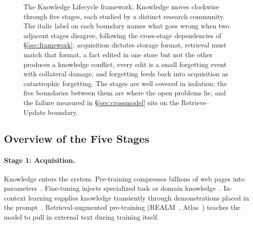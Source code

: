 \documentclass[manuscript, screen, review]{jair}
\begin{document}
\begin{figure}[t]
\caption{The Knowledge Lifecycle framework. Knowledge moves clockwise through five stages, each studied by a distinct research community. The italic label on each boundary names what goes wrong when two adjacent stages disagree, following the cross-stage dependencies of \S\ref{sec:framework}: acquisition dictates storage format, retrieval must match that format, a fact edited in one store but not the other produces a knowledge conflict, every edit is a small forgetting event with collateral damage, and forgetting feeds back into acquisition as catastrophic forgetting. The stages are well covered in isolation; the five boundaries between them are where the open problems lie, and the failure measured in \S\ref{sec:crossmodel} sits on the Retrieve--Update boundary.}
\label{fig:lifecycle}
\end{figure}

\subsection{Overview of the Five Stages}

\paragraph{Stage 1: Acquisition.} Knowledge enters the system. Pre-training compresses billions of web pages into parameters~\citep{kaplan2020scaling, hoffmann2022chinchilla}. Fine-tuning injects specialized task or domain knowledge~\citep{hu2022lora}. In-context learning supplies knowledge transiently through demonstrations placed in the prompt~\citep{min2022rethinking}. Retrieval-augmented pre-training (REALM~\citep{guu2020realm}, Atlas~\citep{izacard2023atlas}) teaches the model to pull in external text during training itself.
\end{document}
